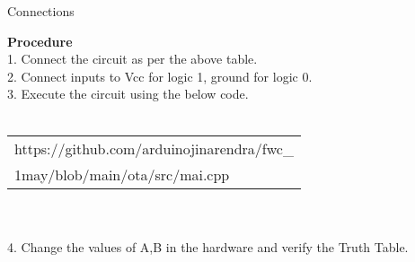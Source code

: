 \documentclass[journal,12pt,twocolumn]{IEEEtran}
\begin{document}
\begin{center}
    Connections
\end{center}
\textbf{Procedure}\\
1. Connect the circuit as per the above table.\\
2. Connect inputs to Vcc for logic 1, ground for logic 0.\\
3. Execute the circuit using the below code.\\
\\\begin{tabularx}{0.45\textwidth} { 
  | >{\centering\arraybackslash}X |
 }
  \hline
https://github.com/arduinojinarendra/fwc\_\\1may/blob/main/ota/src/mai.cpp\\
  \hline
\end{tabularx}\\
\\4. Change the values of A,B in the hardware and verify the Truth Table.\\
\end{document}
